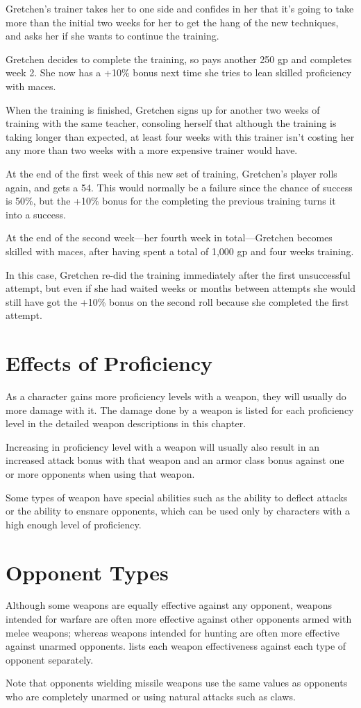 \begin{multicols*}{2}
{Gretchen’s trainer takes her to one side and confides in her that it’s going to take more than the initial two weeks for her to get the hang of the new techniques, and asks her if she wants to continue the training.

Gretchen decides to complete the training, so pays another 250 gp and completes week 2. She now has a +10\% bonus next time she tries to lean skilled proficiency with maces.

When the training is finished, Gretchen signs up for another two weeks of training with the same teacher, consoling herself that although the training is taking longer than expected, at least four weeks with this trainer isn’t costing her any more than two weeks with a more expensive trainer would have.

At the end of the first week of this new set of training, Gretchen’s player rolls again, and gets a 54. This would normally be a failure since the chance of success is 50\%, but the +10\% bonus for the completing the previous training turns it into a success.

At the end of the second week—her fourth week in total—Gretchen becomes skilled with maces, after having spent a total of 1,000 gp and four weeks training.

In this case, Gretchen re-did the training immediately after the first unsuccessful attempt, but even if she had waited weeks or months between attempts she would still have got the +10\% bonus on the second roll because she completed the first attempt.}

\section{Effects of Proficiency}
As a character gains more proficiency levels with a weapon, they will usually do more damage with it. The damage done by a weapon is listed for each proficiency level in the detailed weapon descriptions in this chapter.

Increasing in proficiency level with a weapon will usually also result in an increased attack bonus with that weapon and an armor class bonus against one or more opponents when using that weapon.

Some types of weapon have special abilities such as the ability to deflect attacks or the ability to ensnare opponents, which can be used only by characters with a high enough level of proficiency.

\section{Opponent Types}
Although some weapons are equally effective against any opponent, weapons intended for warfare are often more effective against other opponents armed with melee weapons; whereas weapons intended for hunting are often more effective against unarmed opponents.  lists each weapon effectiveness against each type of opponent separately.

Note that opponents wielding missile weapons use the same values as opponents who are completely unarmed or using natural attacks such as claws.
\end{multicols*}

